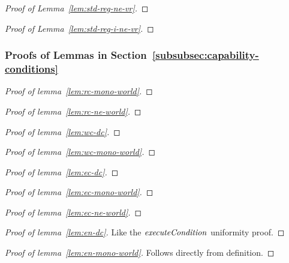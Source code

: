 \documentclass[a4paper]{article}
\newcommand{\plainfun}[2]{
  \ifthenelse{\equal{#2}{}}
             {\mathit{#1}}
             {\mathit{#1}(#2)}
}
\newcommand{\execCond}[1]{\plainfun{executeCondition}{#1}}
\begin{document}
\begin{appendices}
\begin{proof}[Proof of Lemma~\ref{lem:std-reg-ne-vr}]
\end{proof}

\begin{proof}[Proof of Lemma~\ref{lem:std-reg-i-ne-vr}]
\end{proof}

\subsubsection{Proofs of Lemmas in Section~\ref{subsubsec:capability-conditions}}

\begin{proof}[Proof of lemma~\ref{lem:rc-mono-world}]
\end{proof}
\begin{proof}[Proof of lemma~\ref{lem:rc-ne-world}]
\end{proof}
\begin{proof}[Proof of lemma~\ref{lem:wc-dc}]
\end{proof}

\begin{proof}[Proof of lemma~\ref{lem:wc-mono-world}]
\end{proof}


\begin{proof}[Proof of lemma~\ref{lem:ec-dc}]
\end{proof}

\begin{proof}[Proof of lemma~\ref{lem:ec-mono-world}]
\end{proof}


\begin{proof}[Proof of lemma~\ref{lem:ec-ne-world}]
\end{proof}



\begin{proof}[Proof of lemma~\ref{lem:en-dc}]
  Like the $\execCond{}$ uniformity proof.
\end{proof}

\begin{proof}[Proof of lemma~\ref{lem:en-mono-world}]
  Follows directly from definition.
\end{proof}


\end{appendices}
\end{document}
